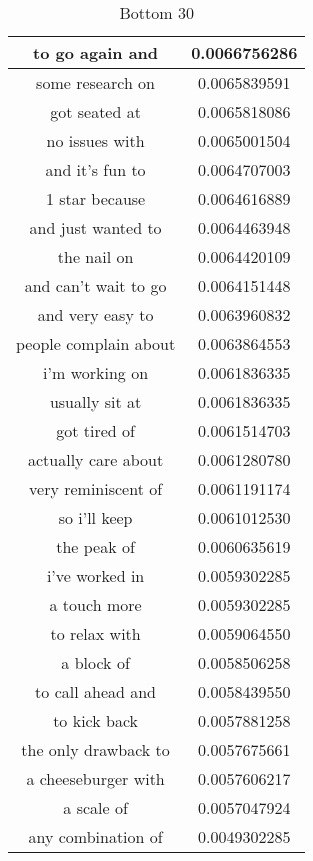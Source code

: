 \documentclass{article}
\begin{document}
\begin{table}[ht]
{\begin{tabular}{|c|c|}
\hline
to go again and & 0.0066756286\\
\hline
some research on & 0.0065839591\\
\hline
got seated at & 0.0065818086\\
\hline
no issues with & 0.0065001504\\
\hline
and it's fun to & 0.0064707003\\
\hline
1 star because & 0.0064616889\\
\hline
and just wanted to & 0.0064463948\\
\hline
the nail on & 0.0064420109\\
\hline
and can't wait to go & 0.0064151448\\
\hline
and very easy to & 0.0063960832\\
\hline
people complain about & 0.0063864553\\
\hline
i'm working on & 0.0061836335\\
\hline
usually sit at & 0.0061836335\\
\hline
got tired of & 0.0061514703\\
\hline
actually care about & 0.0061280780\\
\hline
very reminiscent of & 0.0061191174\\
\hline
so i'll keep & 0.0061012530\\
\hline
the peak of & 0.0060635619\\
\hline
i've worked in & 0.0059302285\\
\hline
a touch more & 0.0059302285\\
\hline
to relax with & 0.0059064550\\
\hline
a block of & 0.0058506258\\
\hline
to call ahead and & 0.0058439550\\
\hline
to kick back & 0.0057881258\\
\hline
the only drawback to & 0.0057675661\\
\hline
a cheeseburger with & 0.0057606217\\
\hline
a scale of & 0.0057047924\\
\hline
any combination of & 0.0049302285\\
\hline
\end{tabular}
\caption{Bottom 30}
}
\end{table}\\
\end{document}
